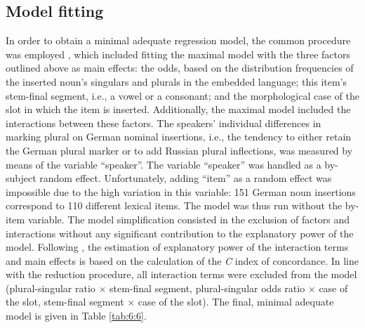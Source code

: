 \subsection{Model fitting}

In order to obtain a minimal adequate regression model, the common procedure was employed \citep{baayen-analyzing,szmrecsanyi-2013}, which included fitting the maximal model with the three factors outlined above as main effects: the odds, based on the distribution frequencies of the inserted noun's singulars and plurals in the embedded language; this item’s stem-final segment, i.e., a vowel or a consonant; and the morphological case of the slot in which the item is inserted. Additionally, the maximal model included the interactions between these factors. The speakers' individual differences in marking plural on German nominal insertions, i.e., the tendency to either retain the German plural marker or to add Russian plural inflections, was measured by means of the variable “speaker”. The variable “speaker” was handled as a by-subject random effect. Unfortunately, adding “item” as a random effect was impossible due to the high variation in this variable: 151 German noun insertions correspond to 110 different lexical items. The model was thus run without the by-item variable. The model simplification consisted in the exclusion of factors and interactions without any significant contribution to the explanatory power of the model. Following \citet[281]{baayen-analyzing}, the estimation of explanatory power of the interaction terms and main effects is based on the calculation of the \textit{C} index of concordance. In line with the reduction procedure, all interaction terms were excluded from the model (plural-singular ratio $\times$ stem-final segment, plural-singular odds ratio $\times$ case of the slot, stem-final segment $\times$ case of the slot). The final, minimal adequate model is given in Table \ref{tab:6:6}.

